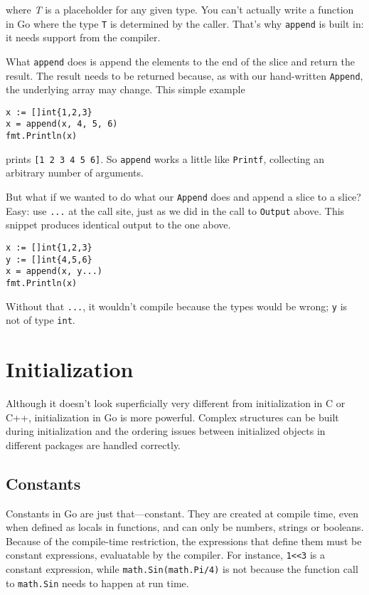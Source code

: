 where \emph{T} is a placeholder for any given type. You can't actually
write a function in Go where the type \texttt{T} is determined by the
caller. That's why \texttt{append} is built in: it needs support from
the compiler.

What \texttt{append} does is append the elements to the end of the slice
and return the result. The result needs to be returned because, as with
our hand-written \texttt{Append}, the underlying array may change. This
simple example

\begin{Verbatim}[frame=single]
x := []int{1,2,3}
x = append(x, 4, 5, 6)
fmt.Println(x)
\end{Verbatim}

prints \texttt{{[}1 2 3 4 5 6{]}}. So \texttt{append} works a little
like \texttt{Printf}, collecting an arbitrary number of arguments.

But what if we wanted to do what our \texttt{Append} does and append a
slice to a slice? Easy: use \texttt{...} at the call site, just as we
did in the call to \texttt{Output} above. This snippet produces
identical output to the one above.

\begin{Verbatim}[frame=single]
x := []int{1,2,3}
y := []int{4,5,6}
x = append(x, y...)
fmt.Println(x)
\end{Verbatim}

Without that \texttt{...}, it wouldn't compile because the types would
be wrong; \texttt{y} is not of type \texttt{int}.

\section*{Initialization}

Although it doesn't look superficially very different from
initialization in C or C++, initialization in Go is more powerful.
Complex structures can be built during initialization and the ordering
issues between initialized objects in different packages are handled
correctly.

\subsection*{Constants}

Constants in Go are just that---constant. They are created at compile
time, even when defined as locals in functions, and can only be numbers,
strings or booleans. Because of the compile-time restriction, the
expressions that define them must be constant expressions, evaluatable
by the compiler. For instance, \texttt{1\textless{}\textless{}3} is a
constant expression, while \texttt{math.Sin(math.Pi/4)} is not because
the function call to \texttt{math.Sin} needs to happen at run time.

